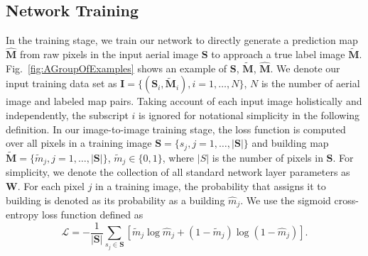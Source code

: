 \subsection{Network Training}
   
 In the training stage, we train our network to directly generate a prediction map $\mathbf{\hat{M}}$ from raw pixels in the input aerial image $\mathbf{S}$ to approach a true label image $\mathbf{\tilde{M}}$. 
 Fig.~\ref{fig:AGroupOfExamples} shows an example of $\mathbf{S}$, $\mathbf{\tilde{M}}$, $\mathbf{\hat{M}}$.  
   We denote our input training data set as $\mathbf{I} = \{(\mathbf{S}_{i},\mathbf{\tilde{M}}_{i}),i = 1,\ldots,N\}$, $N$ is the number of aerial image and labeled map pairs.
Taking account of each input image holistically and independently, the subscript $i$ is ignored  for notational simplicity in the following definition. 
In our image-to-image training stage, the loss function is computed over all pixels in a training image $\mathbf{S} = \{s_{j}, j = 1,\ldots,\vert \mathbf{S} \vert\}$ and building map $\mathbf{\tilde{M}} = \{\tilde{m}_{j}, j = 1,\ldots,\vert \mathbf{S} \vert\}$, $\tilde{m}_j \in \{0,1\}$, where $|S|$ is the number of pixels in $\mathbf{S}$.
%
For simplicity, we denote the collection of all standard network layer parameters as $\mathbf{W}$. For each pixel $j$ in a training image, the probability that assigns it to building is denoted as its probability as a building $\hat{m}_j$. 
We use the sigmoid cross-entropy loss function defined as 
\begin{equation}
	\label{loss}
    \mathcal{L} = - \frac{1}{\vert \mathbf{S} \vert} \sum_{s_j \in \mathbf{S}} \left[ \tilde{m}_j \log{\hat{m}_j} + (1 - \tilde{m}_j)\log{(1 - \hat{m}_j)} \right].
\end{equation}


